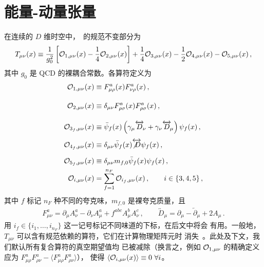 \section{能量-动量张量}\label{sec:emt}

在连续的 $D$ 维时空中，\emt\ 的规范不变部分为
\begin{equation}
  \begin{split}
    T_{\mu\nu}(x) \equiv \frac{1}{g_0^2}\left[
      \mathcal{O}_{1,\mu\nu}(x)-\frac{1}{4}\mathcal{O}_{2,\mu\nu}(x)\right]
    + \frac{1}{4} \mathcal{O}_{3,\mu\nu}(x)
    - \frac{1}{2} \mathcal{O}_{4,\mu\nu}(x)
    - \mathcal{O}_{5 ,\mu\nu}(x) \,,
    \label{eq:emt}
  \end{split}
\end{equation}
其中 $g_0$ 是 QCD 的裸耦合常数。各算符定义为
\begin{equation}
  \begin{split}
    \mathcal{O}_{1,\mu\nu}(x) &\equiv
    F_{\mu\rho}^a(x)F_{\nu\rho}^a(x)\,,\\[10pt] \mathcal{O}_{2,\mu\nu}(x)
    &\equiv
    \delta_{\mu\nu}F_{\rho\sigma}^a(x)F_{\rho\sigma}^a(x)\,,\\[10pt]
    \mathcal{O}_{3_f,\mu\nu}(x) &\equiv
    \bar\psi_{f}(x)\left(\gamma_\mu\overleftrightarrow{D}\!_\nu
    +\gamma_\nu\overleftrightarrow{D}\!_\mu\right)\psi_{f}(x)\,,\\
    \mathcal{O}_{4_f,\mu\nu}(x)
    &\equiv \delta_{\mu\nu}\bar\psi_{f}(x)
    \overleftrightarrow{\not{D}}\psi_{f}(x)\,,\phantom{\bigg(\bigg)}\\
    \mathcal{O}_{5_f,\mu\nu}(x)
    &\equiv \delta_{\mu\nu}
    m_{f,0}\bar\psi_{f}(x)\psi_{f}(x)\,,\\
    \mathcal{O}_{i,\mu\nu}(x) &=
    \sum_{f=1}^{n_F}\mathcal{O}_{i_f,\mu\nu}(x)\,,\qquad i\in\{3,4,5\}\,,
    \label{eq:ops}
  \end{split}
\end{equation}
其中 $f$ 标记 $n_F$ 种不同的夸克味，$m_{f,0}$ 是裸夸克质量，且
\begin{equation}
  \begin{split}
    F^a_{\mu\nu} = \partial_\mu A_\nu^a - \partial_\nu A_\mu^a +
    f^{abc}A_\mu^bA_\nu^c\,,\qquad
    \overleftrightarrow{D}\!_\mu = \partial_\mu -
    \overleftarrow{\partial}\!_\mu + 2A_\mu\,.
  \end{split}
\end{equation}
用 $i_f\in\{i_1,\ldots,i_{n_F}\}$ 这一记号标记不同味道的下标，在后文中将会
有用。一般地，$T_{\mu\nu}$ 可以含有规范依赖的算符，它们在计算物理矩阵元时
消失~\cite{Nielsen:1977sy}。此处及下文，我们默认所有复合算符的真空期望值均
已被减除（换言之，例如 $\mathcal{O}_{1,\mu\nu}$ 的精确定义应为
$F_{\mu\rho}^aF_{\rho\nu}^a-\langle F_{\mu\rho}^aF_{\rho\nu}^a\rangle$），
使得 $\langle \mathcal{O}_{i,\mu\nu}(x)\rangle\equiv 0\ \forall i$。

